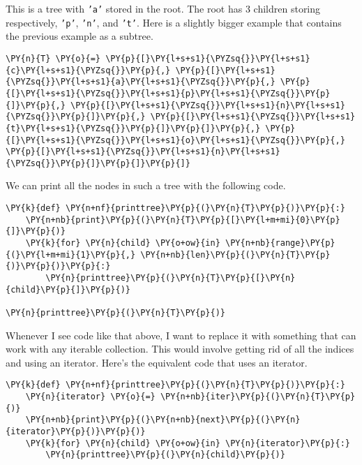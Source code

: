 This is a tree with \texttt{'a'} stored in the root.
The root has 3 children storing respectively, \texttt{'p'}, \texttt{'n'}, and \texttt{'t'}.
Here is a slightly bigger example that contains the previous example as a subtree.

\begin{Verbatim}[commandchars=\\\{\}]
\PY{n}{T} \PY{o}{=} \PY{p}{[}\PY{l+s+s1}{\PYZsq{}}\PY{l+s+s1}{c}\PY{l+s+s1}{\PYZsq{}}\PY{p}{,} \PY{p}{[}\PY{l+s+s1}{\PYZsq{}}\PY{l+s+s1}{a}\PY{l+s+s1}{\PYZsq{}}\PY{p}{,} \PY{p}{[}\PY{l+s+s1}{\PYZsq{}}\PY{l+s+s1}{p}\PY{l+s+s1}{\PYZsq{}}\PY{p}{]}\PY{p}{,} \PY{p}{[}\PY{l+s+s1}{\PYZsq{}}\PY{l+s+s1}{n}\PY{l+s+s1}{\PYZsq{}}\PY{p}{]}\PY{p}{,} \PY{p}{[}\PY{l+s+s1}{\PYZsq{}}\PY{l+s+s1}{t}\PY{l+s+s1}{\PYZsq{}}\PY{p}{]}\PY{p}{]}\PY{p}{,} \PY{p}{[}\PY{l+s+s1}{\PYZsq{}}\PY{l+s+s1}{o}\PY{l+s+s1}{\PYZsq{}}\PY{p}{,} \PY{p}{[}\PY{l+s+s1}{\PYZsq{}}\PY{l+s+s1}{n}\PY{l+s+s1}{\PYZsq{}}\PY{p}{]}\PY{p}{]}\PY{p}{]}
\end{Verbatim}



We can print all the nodes in such a tree with the following code.

\begin{Verbatim}[commandchars=\\\{\}]
\PY{k}{def} \PY{n+nf}{printtree}\PY{p}{(}\PY{n}{T}\PY{p}{)}\PY{p}{:}
    \PY{n+nb}{print}\PY{p}{(}\PY{n}{T}\PY{p}{[}\PY{l+m+mi}{0}\PY{p}{]}\PY{p}{)}
    \PY{k}{for} \PY{n}{child} \PY{o+ow}{in} \PY{n+nb}{range}\PY{p}{(}\PY{l+m+mi}{1}\PY{p}{,} \PY{n+nb}{len}\PY{p}{(}\PY{n}{T}\PY{p}{)}\PY{p}{)}\PY{p}{:}
        \PY{n}{printtree}\PY{p}{(}\PY{n}{T}\PY{p}{[}\PY{n}{child}\PY{p}{]}\PY{p}{)}

\PY{n}{printtree}\PY{p}{(}\PY{n}{T}\PY{p}{)}
\end{Verbatim}



Whenever I see code like that above, I want to replace it with something that can work with any iterable collection.
This would involve getting rid of all the indices and using an iterator.  Here's the equivalent code that uses an iterator.

\begin{Verbatim}[commandchars=\\\{\}]
\PY{k}{def} \PY{n+nf}{printtree}\PY{p}{(}\PY{n}{T}\PY{p}{)}\PY{p}{:}
    \PY{n}{iterator} \PY{o}{=} \PY{n+nb}{iter}\PY{p}{(}\PY{n}{T}\PY{p}{)}
    \PY{n+nb}{print}\PY{p}{(}\PY{n+nb}{next}\PY{p}{(}\PY{n}{iterator}\PY{p}{)}\PY{p}{)}
    \PY{k}{for} \PY{n}{child} \PY{o+ow}{in} \PY{n}{iterator}\PY{p}{:}
        \PY{n}{printtree}\PY{p}{(}\PY{n}{child}\PY{p}{)}
\end{Verbatim}



